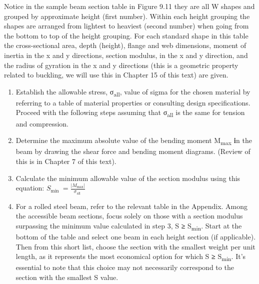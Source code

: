 \documentclass[
  letterpaper,
  DIV=11,
  numbers=noendperiod]{scrreprt}
\providecommand{\tightlist}{%
  \setlength{\itemsep}{0pt}\setlength{\parskip}{0pt}}\usepackage{longtable,booktabs,array}
\begin{document}
Notice in the sample beam section table in Figure 9.11 they are all W
shapes and grouped by approximate height (first number). Within each
height grouping the shapes are arranged from lightest to heaviest
(second number) when going from the bottom to top of the height
grouping. For each standard shape in this table the cross-sectional
area, depth (height), flange and web dimensions, moment of inertia in
the x and y directions, section modulus, in the x and y direction, and
the radius of gyration in the x and y directions (this is a geometric
property related to buckling, we will use this in Chapter 15 of this
text) are given.

\begin{tcolorbox}[enhanced jigsaw, colback=white, colframe=quarto-callout-note-color-frame, leftrule=.75mm, opacitybacktitle=0.6, colbacktitle=quarto-callout-note-color!10!white, arc=.35mm, bottomrule=.15mm, breakable, title={Step-by-step: Most Economical Beam Design (standard shapes)}, left=2mm, titlerule=0mm, toptitle=1mm, toprule=.15mm, opacityback=0, rightrule=.15mm, coltitle=black, bottomtitle=1mm]

\begin{enumerate}
\def\labelenumi{\arabic{enumi}.}
\tightlist
\item
  Establish the allowable stress, σ\textsubscript{all}, value of sigma
  for the chosen material by referring to a table of material properties
  or consulting design specifications. Proceed with the following steps
  assuming that σ\textsubscript{all} is the same for tension and
  compression.
\item
  Determine the maximum absolute value of the bending moment
  \textbar M\textsubscript{max}\textbar{} \textbf{i}n the beam by
  drawing the shear force and bending moment diagrams. (Review of this
  is in Chapter 7 of this text).
\item
  Calculate the minimum allowable value of the section modulus using
  this equation:
  \(S_{\text {min }}=\frac{\left|M_{\max }\right|}{\sigma_{\text {all }}}\)
\item
  For a rolled steel beam, refer to the relevant table in the Appendix.
  Among the accessible beam sections, focus solely on those with a
  section modulus surpassing the minimum value calculated in step 3, S
  \textbf{≥} S\textsubscript{min}. Start at the bottom of the table and
  select one beam in each height section (if applicable). Then from this
  short list, choose the section with the smallest weight per unit
  length, as it represents the most economical option for which S
  \textbf{≥} S\textsubscript{min}. It's essential to note that this
  choice may not necessarily correspond to the section with the smallest
  S value.
\end{enumerate}

\end{tcolorbox}
\end{document}
